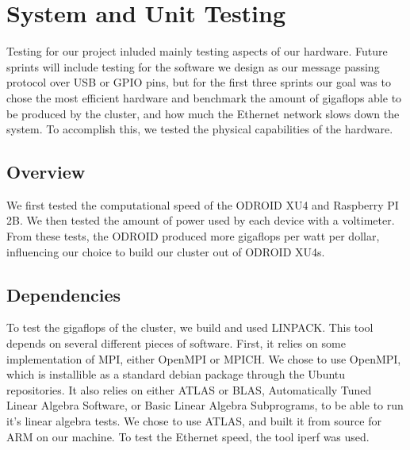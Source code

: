 

\chapter{System  and Unit Testing}
Testing for our project inluded mainly testing aspects of our hardware. Future sprints will include testing for the software we design as our message passing protocol over USB or GPIO pins, but for the first three sprints our goal was to chose the most efficient hardware and benchmark the amount of gigaflops able to be produced by the cluster, and how much the Ethernet network slows down the system. To accomplish this, we tested the physical capabilities of the hardware.

\section{Overview}


We first tested the computational speed of the ODROID XU4 and Raspberry PI 2B. We then tested the amount of power used by each device with a voltimeter. From these tests, the ODROID produced more gigaflops per watt per dollar, influencing our choice to build our cluster out of ODROID XU4s.

\section{Dependencies}
To test the gigaflops of the cluster, we build and used LINPACK. This tool depends on several different pieces of software. First, it relies on some implementation of MPI, either OpenMPI or MPICH. We chose to use OpenMPI, which is installible as a standard debian package through the Ubuntu repositories. It also relies on either ATLAS or BLAS, Automatically Tuned Linear Algebra Software, or Basic Linear Algebra Subprograms, to be able to run it's linear algebra tests. We chose to use ATLAS, and built it from source for ARM on our machine. To test the Ethernet speed, the tool iperf was used.

